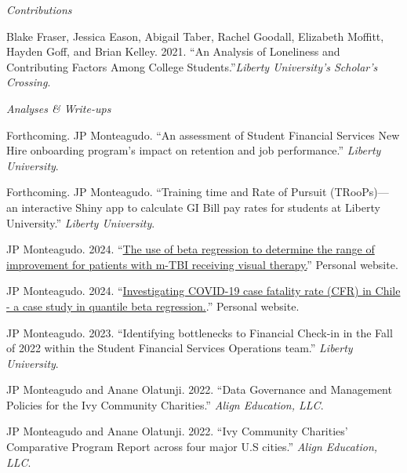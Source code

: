 \documentclass[11.5pt,article,oneside]{memoir}
\begin{document}
 
\medskip
\noindent\emph{Contributions \vspace{0.02in}}

\ind  Blake Fraser, Jessica Eason, Abigail Taber, Rachel Goodall, Elizabeth Moffitt, Hayden Goff, and Brian Kelley. 2021. “An Analysis of Loneliness and Contributing Factors Among College Students.”\emph{Liberty University's Scholar's Crossing}. \vspace{0.05in}

\vspace{-0.075in}

\normalsize

\bigskip
\noindent\emph{Analyses \& Write-ups \vspace{0.05in}}
 
\ind Forthcoming. JP Monteagudo. “An assessment of Student Financial Services New Hire onboarding program's impact on retention and job performance.” \emph{Liberty University}. 

\ind Forthcoming. JP Monteagudo. “Training time and Rate of Pursuit (TRooPs)— an interactive Shiny app to calculate GI Bill pay rates for students at Liberty University.” \emph{Liberty University}.

\ind JP Monteagudo. 2024. ``\href{https://jpmonteagudo.com/blog}{The use of beta regression to determine the range of improvement for patients with m-TBI receiving visual therapy.}” Personal website.

\ind JP Monteagudo. 2024. ``\href{https://jpmonteagudo.com/blog}{Investigating COVID-19 case fatality rate (CFR) in Chile - a case study in quantile beta regression.}.'' Personal website.

\ind JP Monteagudo. 2023. ``Identifying bottlenecks to Financial Check-in in the Fall of 2022 within the Student Financial Services Operations team.'' \emph{Liberty University}. 

\ind JP Monteagudo and Anane Olatunji. 2022. ``Data Governance and Management Policies for the Ivy Community Charities.'' \emph{Align Education, LLC}.

\ind JP Monteagudo and Anane Olatunji. 2022. ``Ivy Community Charities' Comparative Program Report across four major U.S cities.'' \emph{Align Education, LLC}.



 \medskip
\end{document}
